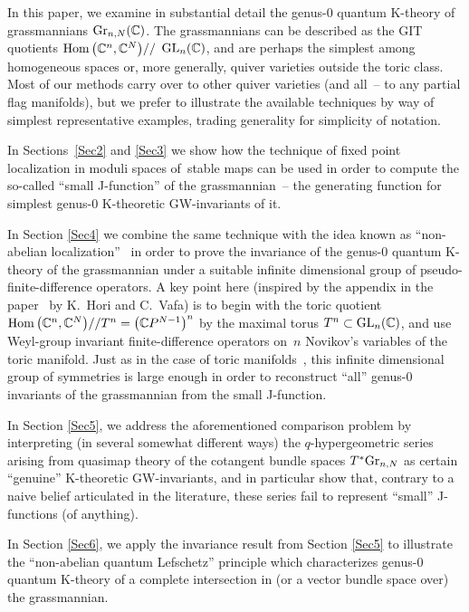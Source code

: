 \documentclass[pdftex]{sigma}
\numberwithin{equation}{section}
\def\CC{\mathbb C}
\begin{document}
In this paper, we examine in substantial detail the genus-0 quantum K-theory of grass\-mannians ${\rm Gr}_{n,N}(\CC)$. The gras\-sman\-ni\-ans can be described as the GIT quotients $\mathop{\rm Hom} \big(\CC^n,\CC^N\big)//$ ${\rm GL}_n(\CC)$, and are perhaps the simplest among homogeneous spaces or, more generally, quiver varieties outside the toric class. Most of our methods carry over to other quiver varieties (and all~-- to any partial flag manifolds), but we prefer to illustrate the available techniques by way of simplest representative examples, trading generality for simplicity of notation.

In Sections~\ref{Sec2} and \ref{Sec3} we show how the technique of fixed point localization in moduli spaces of~stable maps can be used in order to compute the so-called ``small J-function'' of the grassmannian~-- the generating function for simplest genus-0 K-theoretic GW-invariants of it.

In Section \ref{Sec4} we combine the same technique with the idea known as ``non-abelian localization''~\cite{BCK2} in order to prove the invariance of the genus-0 quantum K-theory of the grassmannian under a suitable infinite dimensional group of pseudo-finite-difference operators. A key point here (inspired by the appendix in the paper~\cite{Hori-Vafa} by K.~Hori and C.~Vafa) is to begin with the toric quotient $\mathop{\rm Hom}\big(\CC^n,\CC^N\big)//T^n=\big(\CC P^{N-1}\big)^n$ by the maximal torus $T^n\subset {\rm GL}_n(\CC)$, and use Weyl-group invariant finite-difference operators on~$n$ Novikov's variables of the toric manifold.
Just as in the case of toric manifolds~\cite{Givental:perm8}, this infinite dimensional group of symmetries is large enough in order to reconstruct ``all'' genus-0 invariants of the grassmannian from the small J-function.

In Section \ref{Sec5}, we address the aforementioned comparison problem by interpreting (in several somewhat different ways) the $q$-hypergeometric series arising from quasimap theory of the cotangent bundle spaces $T^*{\rm Gr}_{n,N}$ as certain ``genuine'' K-theoretic GW-invariants, and in particular show that, contrary to a naive belief articulated in the literature, these series fail to represent ``small'' J-functions (of anything).

In Section \ref{Sec6}, we apply the invariance result from Section \ref{Sec5} to illustrate the ``non-abelian quantum Lefschetz'' principle which characterizes genus-0 quantum K-theory of a complete intersection in (or a vector bundle space over) the grassmannian.
\end{document}
